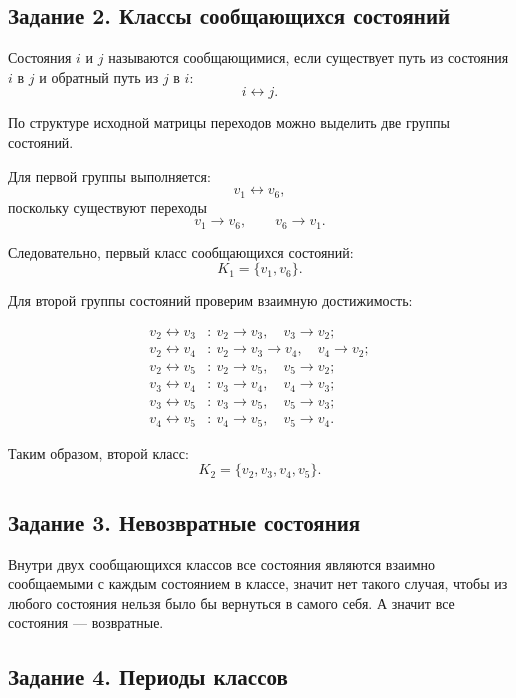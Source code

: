 \documentclass[a4paper, final]{article}
\begin{document}
	\subsection*{Задание 2. Классы сообщающихся состояний}
	
	Состояния $i$ и $j$ называются сообщающимися,
	если существует путь из состояния $i$ в $j$ и
	обратный путь из $j$ в $i$:
	\[
	i\leftrightarrow j.
	\]
	
	По структуре исходной матрицы переходов можно
	выделить две группы состояний.
	
	Для первой группы выполняется:
	\[
	v_1\leftrightarrow v_6,
	\]
	поскольку существуют переходы
	\[
	v_1\rightarrow v_6,\qquad
	v_6\rightarrow v_1.
	\]
	
	Следовательно, первый класс сообщающихся состояний:
	\[
	K_1=\{v_1,v_6\}.
	\]
	
	Для второй группы состояний проверим взаимную
	достижимость:
	
	\[
	\begin{aligned}
		v_2\leftrightarrow v_3 &:\
		v_2\rightarrow v_3,\quad v_3\rightarrow v_2;\\
		v_2\leftrightarrow v_4 &:\
		v_2\rightarrow v_3\rightarrow v_4,\quad
		v_4\rightarrow v_2;\\
		v_2\leftrightarrow v_5 &:\
		v_2\rightarrow v_5,\quad v_5\rightarrow v_2;\\
		v_3\leftrightarrow v_4 &:\
		v_3\rightarrow v_4,\quad v_4\rightarrow v_3;\\
		v_3\leftrightarrow v_5 &:\
		v_3\rightarrow v_5,\quad v_5\rightarrow v_3;\\
		v_4\leftrightarrow v_5 &:\
		v_4\rightarrow v_5,\quad v_5\rightarrow v_4.
	\end{aligned}
	\]
	
	Таким образом, второй класс:
	\[
	K_2=\{v_2,v_3,v_4,v_5\}.
	\]
	
	\subsection*{Задание 3. Невозвратные состояния}
	
Внутри двух сообщающихся классов все состояния являются взаимно сообщаемыми с каждым состоянием в классе, значит нет такого случая, чтобы из любого состояния нельзя было бы вернуться в самого себя. А значит все состояния — возвратные.
	
	\subsection*{Задание 4. Периоды классов}
	
\end{document}
